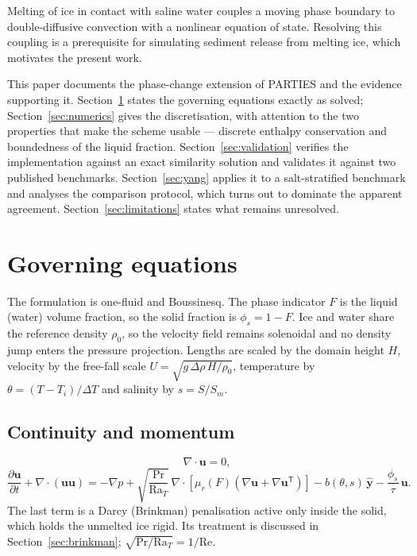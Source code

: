 \documentclass[review,12pt]{elsarticle}
\newcommand{\uvec}{\mathbf{u}}
\newcommand{\Ra}{\mathrm{Ra}}
\begin{document}
Melting of ice in contact with saline water couples a moving phase boundary to
double-diffusive convection with a nonlinear equation of state. Resolving this
coupling is a prerequisite for simulating sediment release from melting ice,
which motivates the present work.

This paper documents the phase-change extension of PARTIES and the evidence
supporting it. Section~\ref{sec:goveq} states the governing equations exactly as
solved; Section~\ref{sec:numerics} gives the discretisation, with attention to
the two properties that make the scheme usable --- discrete enthalpy
conservation and boundedness of the liquid fraction. Section~\ref{sec:validation}
verifies the implementation against an exact similarity solution and validates it
against two published benchmarks. Section~\ref{sec:yang} applies it to a
salt-stratified benchmark and analyses the comparison protocol, which turns out
to dominate the apparent agreement. Section~\ref{sec:limitations} states what
remains unresolved.

\section{Governing equations}
\label{sec:goveq}

The formulation is one-fluid and Boussinesq. The phase indicator $F$ is the
liquid (water) volume fraction, so the solid fraction is $\phi_s = 1-F$. Ice and
water share the reference density $\rho_0$, so the velocity field remains
solenoidal and no density jump enters the pressure projection. Lengths are
scaled by the domain height $H$, velocity by the free-fall scale
$U=\sqrt{g\,\Delta\rho\,H/\rho_0}$, temperature by
$\theta = (T-T_i)/\Delta T$ and salinity by $s = S/S_m$.

\subsection{Continuity and momentum}

\begin{equation}
  \nabla\cdot\uvec = 0 ,
  \label{eq:continuity}
\end{equation}
\begin{equation}
  \frac{\partial \uvec}{\partial t} + \nabla\cdot(\uvec\uvec)
  = -\nabla p
  + \sqrt{\frac{\mathrm{Pr}}{\Ra_T}}\,
    \nabla\cdot\!\left[\mu_r(F)\left(\nabla\uvec + \nabla\uvec^{\mathsf T}\right)\right]
  - b(\theta,s)\,\hat{\mathbf{y}}
  - \frac{\phi_s}{\tau}\,\uvec .
  \label{eq:momentum}
\end{equation}
The last term is a Darcy (Brinkman) penalisation active only inside the solid,
which holds the unmelted ice rigid. Its treatment is discussed in
Section~\ref{sec:brinkman}; $\sqrt{\mathrm{Pr}/\Ra_T} = 1/\mathrm{Re}$.
\end{document}
